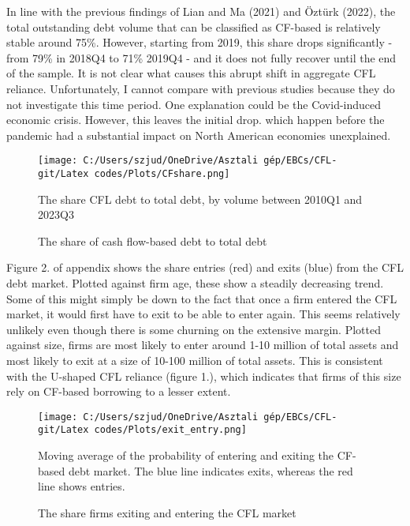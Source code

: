 \documentclass[12pt]{article}
\begin{document}
\noindent In line with the previous findings of Lian and Ma (2021) and Öztürk (2022), the total outstanding debt volume that can be classified as CF-based is relatively stable around 75\%. However, starting from 2019, this share drops significantly - from 79\% in 2018Q4 to 71\% 2019Q4 - and it does not fully recover until the end of the sample. It is not clear what causes this abrupt shift in aggregate CFL reliance. Unfortunately, I cannot compare with previous studies because they do not investigate this time period. One explanation could be the Covid-induced economic crisis. However, this leaves the initial drop. which happen before the pandemic had a substantial impact on North American economies unexplained. 

\begin{figure}[H]  %
    \centering
    \caption{The share of cash flow-based debt to total debt} \label{chart:CFLshare}
    \texttt{[image: C:/Users/szjud/OneDrive/Asztali gép/EBCs/CFL-git/Latex codes/Plots/CFshare.png]}
    
     \small The share CFL debt to total debt, by volume between 2010Q1 and 2023Q3
\end{figure}

\noindent Figure 2. of appendix shows the share entries (red) and exits (blue) from the CFL debt market. Plotted against firm age, these show a steadily decreasing trend. Some of this might simply be down to the fact that once a firm entered the CFL market, it would first have to exit to be able to enter again. This seems relatively unlikely even though there is some churning on the extensive margin. Plotted against size, firms are most likely to enter around 1-10 million of total assets and most likely to exit at a size of 10-100 million of total assets. This is consistent with the U-shaped CFL reliance (figure 1.), which indicates that firms of this size rely on CF-based borrowing to a lesser extent. 

\begin{figure}[H]  %
    \centering
    \caption{The share firms exiting and entering the CFL market}\label{chart:exitenter}
    \texttt{[image: C:/Users/szjud/OneDrive/Asztali gép/EBCs/CFL-git/Latex codes/Plots/exit\_entry.png]} 
    
     \small Moving average of the probability of entering and exiting the CF-based debt market. The blue line indicates exits, whereas the red line shows entries.
\end{figure}
\end{document}
